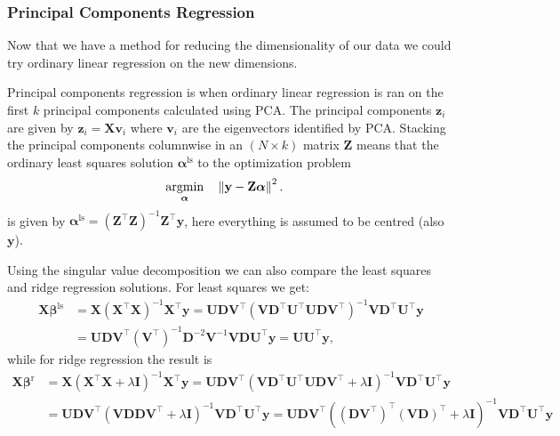 \documentclass[a4paper, 12pt]{scrartcl}
\newcommand{\bfbeta}{\boldsymbol{\beta}}
\newcommand{\bfalpha}{\boldsymbol{\alpha}}
\begin{document}
\subsubsection*{Principal Components Regression}
Now that we have a method for reducing the dimensionality of our data we could try ordinary linear regression on the new dimensions.
\begin{algorithm}
	Principal components regression is when ordinary linear regression is ran on the first $k$ principal components calculated using PCA.
	The principal components $\mathbf{z}_i$ are given by $\mathbf{z}_i=\mathbf{X}\mathbf{v}_i$ where $\mathbf{v}_i$ are the eigenvectors identified by PCA.
	Stacking the principal components columnwise in an $\left(N\times k\right)$ matrix $\mathbf{Z}$ means that the ordinary least squares solution $\bfalpha^\mathrm{ls}$ to the optimization problem
	\begin{equation*}
	\begin{aligned}
	\operatornamewithlimits{argmin}_{\bfalpha} & & &\left\|\mathbf{y}-\mathbf{Z}\bfalpha\right\|^2.
	\end{aligned}
	\end{equation*}
	is given by $\bfalpha^\mathrm{ls}=\left(\mathbf{Z}^\intercal\mathbf{Z}\right)^{-1}\mathbf{Z}^\intercal\mathbf{y}$, here everything is assumed to be centred (also $\mathbf{y}$).
\end{algorithm}


Using the singular value decomposition we can also compare the least squares and ridge regression solutions.
For least squares we get:
\begin{align*}
	\mathbf{X}\bfbeta^\mathrm{ls}&=\mathbf{X}\left(\mathbf{X}^\intercal\mathbf{X}\right)^{-1}\mathbf{X}^\intercal\mathbf{y}
	=\mathbf{U}\mathbf{D}\mathbf{V}^\intercal\left(\mathbf{V}\mathbf{D}^\intercal\mathbf{U}^\intercal\mathbf{U}\mathbf{D}\mathbf{V}^\intercal\right)^{-1}\mathbf{V}\mathbf{D}^\intercal\mathbf{U}^\intercal\mathbf{y}\\
	&=\mathbf{U}\mathbf{D}\mathbf{V}^\intercal\left(\mathbf{V}^\intercal\right)^{-1}\mathbf{D}^{-2}\mathbf{V}^{-1}\mathbf{V}\mathbf{D}\mathbf{U}^\intercal\mathbf{y}
	=\mathbf{U}\mathbf{U}^\intercal\mathbf{y},
\end{align*}
while for ridge regression the result is
\begin{align*}
	\mathbf{X}\bfbeta^\mathrm{r}&=\mathbf{X}\left(\mathbf{X}^\intercal\mathbf{X}+\lambda\mathbf{I}\right)^{-1}\mathbf{X}^\intercal\mathbf{y}
	=\mathbf{U}\mathbf{D}\mathbf{V}^\intercal\left(\mathbf{V}\mathbf{D}^\intercal\mathbf{U}^\intercal\mathbf{U}\mathbf{D}\mathbf{V}^\intercal+\lambda\mathbf{I}\right)^{-1}\mathbf{V}\mathbf{D}^\intercal\mathbf{U}^\intercal\mathbf{y}\\
	&=\mathbf{U}\mathbf{D}\mathbf{V}^\intercal\left(\mathbf{V}\mathbf{D}\mathbf{D}\mathbf{V}^\intercal+\lambda\mathbf{I}\right)^{-1}\mathbf{V}\mathbf{D}^\intercal\mathbf{U}^\intercal\mathbf{y}
	=\mathbf{U}\mathbf{D}\mathbf{V}^\intercal\left(\left(\mathbf{D}\mathbf{V}^\intercal\right)^\intercal\left(\mathbf{V}\mathbf{D}\right)^\intercal+\lambda\mathbf{I}\right)^{-1}\mathbf{V}\mathbf{D}^\intercal\mathbf{U}^\intercal\mathbf{y}
\end{align*}
\end{document}
